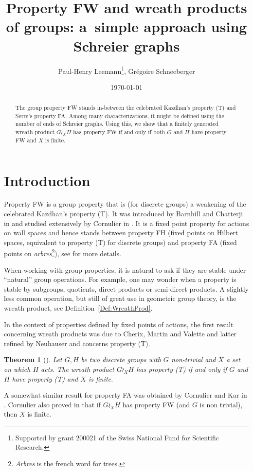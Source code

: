 \documentclass[a4paper]{article}
\title{Property FW and wreath products of groups: a~simple approach using Schreier graphs}
\author{Paul-Henry Leemann\thanks{Supported by grant 200021\textunderscore188578 of the Swiss National Fund for Scientific Research.}, Grégoire Schneeberger}
\date{\today}
\newtheorem{thm}[lem]{Theorem}
\theoremstyle{definition}
\theoremstyle{remark}%
\begin{document}
\maketitle
%
%
%
%
%
%
%
%
%
%
\begin{abstract}
The group property FW stands in-between the celebrated Kazdhan's property (T) and Serre's property FA. Among many characterizations, it might be defined using the number of ends of Schreier graphs.
Using this, we show that a finitely generated wreath product $G\wr_XH$ has property FW if and only if both $G$ and $H$ have property FW and $X$ is finite.
\end{abstract}
%
%
%
%
%
%
%
%
%
%
\section{Introduction}
%
%
%
%
%
Property FW is a group property that is (for discrete groups) a weakening of the celebrated Kazdhan's property (T). It was introduced by Barnhill and Chatterji in \cite{Barnhill2008} and studied extensively by Cornulier in \cite{Cornulier2013}. It is a fixed point property for actions on wall spaces and hence stands between property FH (fixed points on Hilbert spaces, equivalent to property (T) for discrete groups) and property FA (fixed points on \emph{arbres}\footnote{\emph{Arbres} is the french word for trees.}), see \cite{Cornulier2013} for more details.

When working with group properties, it is natural to ask if they are stable under ``natural'' group operations. For example, one may wonder when a property is stable by subgroups, quotients, direct products or semi-direct products.
A slightly less common operation, but still of great use in geometric group theory, is the wreath product, see Definition~\ref{Def:WreathProd}.

In the context of properties defined by fixed points of actions, the first result concerning wreath products was due to Cherix, Martin and Valette and latter refined by Neuhauser and concerns property (T).
%
%
\begin{thm}[\cite{Cherix2004,Neuhauser2005a}] \label{T:Wreath_prop_T}
Let $G,H$ be two discrete groups with $G$ non-trivial and $X$ a set on which $H$ acts. The wreath product $G \wr_X H$ has property (T) if and only if $G$ and $H$ have property (T) and $X$ is finite.
\end{thm}
%
%
A somewhat similar result for property FA was obtained by Cornulier and Kar in \cite{Cornulier2011}.
Cornulier also proved in \cite{Cornulier2013} that if $G\wr_XH$ has property FW (and $G$ is non trivial), then $X$ is finite.
\end{document}
